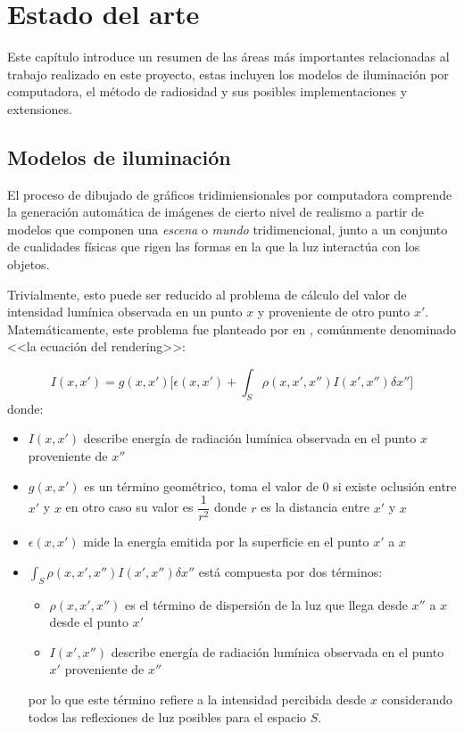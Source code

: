 \chapter{Estado del arte}
\label{ch:chap02}

Este capítulo introduce un resumen de las áreas más importantes relacionadas al trabajo realizado en este proyecto, estas incluyen los modelos de iluminación por computadora, el método de radiosidad y sus posibles implementaciones y extensiones.

\section{Modelos de iluminación}
\label{sec:dibujado}

El proceso de dibujado de gráficos tridimiensionales por computadora comprende la generación automática de imágenes de cierto nivel de realismo a partir de modelos que componen una \textit{escena} o \textit{mundo} tridimencional, junto a un conjunto de cualidades físicas que rigen las formas en la que la luz interactúa con los objetos.

Trivialmente, esto puede ser reducido al problema de cálculo del valor de intensidad lumínica observada en un punto $x$ y proveniente de
otro punto $x'$. Matemáticamente, este problema fue planteado por \citeauthor{Kajiya} en \citeyear{Kajiya}, comúnmente denominado <<la ecuación del rendering>>:

\begin{equation}
    I(x,x') = g(x,x') \bigg[\epsilon(x,x') + \int_{S} \rho(x,x',x'')I(x',x'') \delta x''\bigg] \label{eq:rendering}
\end{equation}
donde:
\begin{itemize}
    \item $I(x,x')$ describe energía de radiación lumínica observada en el punto $x$ proveniente de $x''$
    \item $g(x,x')$ es un término geométrico, toma el valor de $0$ si existe oclusión entre $x'$ y $x$ en otro caso su valor es $\dfrac{1}{r^{2}}$ donde $r$ es la distancia entre $x'$ y $x$
    \item $\epsilon(x,x')$ mide la energía emitida por la superficie en el punto $x'$ a $x$
    \item $\int_{S} \rho(x,x',x'')I(x',x'') \delta x''$ está compuesta por dos términos:
        \begin{itemize}
            \item $\rho(x,x',x'')$ es el término de dispersión de la luz que llega desde $x''$ a $x$ desde el punto $x'$
            \item $I(x',x'')$ describe energía de radiación lumínica observada en el punto $x'$ proveniente de $x''$
        \end{itemize}
    por lo que este término refiere a la intensidad percibida desde $x$ considerando todos las reflexiones de
    luz posibles para el espacio $S$.
\end{itemize}

